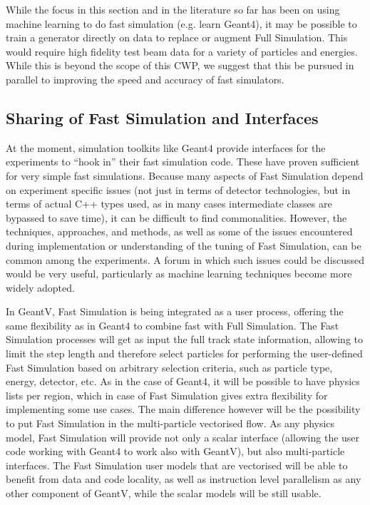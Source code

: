 \documentclass[12pt,a4paper]{article}
\begin{document}
{While the focus in this section and in the literature so far has been on
using machine learning to do fast simulation (e.g. learn Geant4), it may
be possible to train a generator directly on data to replace or augment
Full Simulation. This would require high fidelity test beam data for a
variety of particles and energies. While this is beyond the scope of
this CWP, we suggest that this be pursued in parallel to improving the
speed and accuracy of fast simulators.

\hypertarget{sharing-of-fast-simulation-and-interfaces}{%
\subsection{Sharing of Fast Simulation and
Interfaces}\label{sharing-of-fast-simulation-and-interfaces}}

At the moment, simulation toolkits like Geant4 provide interfaces for
the experiments to ``hook in'' their fast simulation code. These have
proven sufficient for very simple fast simulations. Because many aspects
of Fast Simulation depend on experiment specific issues (not just in
terms of detector technologies, but in terms of actual C++ types used,
as in many cases intermediate classes are bypassed to save time), it can
be difficult to find commonalities. However, the techniques, approaches,
and methods, as well as some of the issues encountered during
implementation or understanding of the tuning of Fast Simulation, can be
common among the experiments. A forum in which such issues could be
discussed would be very useful, particularly as machine learning
techniques become more widely adopted.

In GeantV, Fast Simulation is being integrated as a user process,
offering the same flexibility as in Geant4 to combine fast with Full
Simulation. The Fast Simulation processes will get as input the full
track state information, allowing to limit the step length and therefore
select particles for performing the user-defined Fast Simulation based
on arbitrary selection criteria, such as particle type, energy,
detector, etc. As in the case of Geant4, it will be possible to have
physics lists per region, which in case of Fast Simulation gives extra
flexibility for implementing some use cases. The main difference however
will be the possibility to put Fast Simulation in the multi-particle
vectorised flow. As any physics model, Fast Simulation will provide not
only a scalar interface (allowing the user code working with Geant4 to
work also with GeantV), but also multi-particle interfaces. The Fast
Simulation user models that are vectorised will be able to benefit from
data and code locality, as well as instruction level parallelism as any
other component of GeantV, while the scalar models will be still usable.

}
\end{document}

